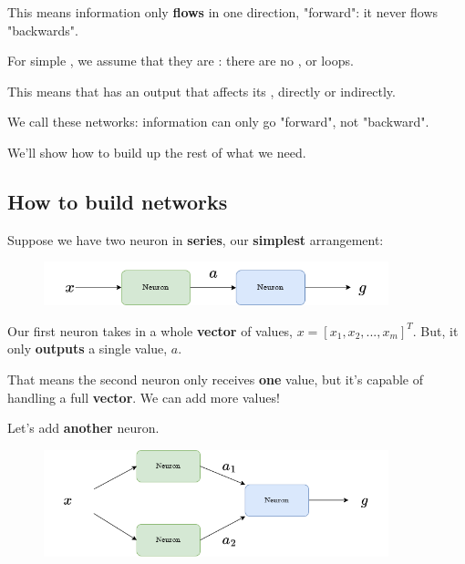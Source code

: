         This means information only \textbf{flows} in one direction, "forward": it never flows "backwards".\\
        
        \begin{concept}
            For simple , we assume that they are : there are no , or loops.
            
            This means that  has an output that affects its , directly or indirectly.
            
            We call these  networks: information can only go "forward", not "backward".
        \end{concept}
        
        We'll show how to build up the rest of what we need.
    
    \subsection{How to build networks}
        
        Suppose we have two neuron in \textbf{series}, our \textbf{simplest} arrangement:
        
        \begin{figure}[H]
            \centering
            \includegraphics[width=100mm,scale=0.4]{images/nn_images/series_a.png}
        \end{figure}
        
        Our first neuron takes in a whole \textbf{vector} of values, $x = [x_1, x_2, ..., x_m]^T$. But, it only \textbf{outputs} a single value, $a$.
        
        That means the second neuron only receives \textbf{one} value, but it's capable of handling a full \textbf{vector}. We can add more values!
        
        Let's add \textbf{another} neuron.
        
        \begin{figure}[H]
            \centering
            \includegraphics[width=100mm,scale=0.4]{images/nn_images/two_neurons_a.png}
        \end{figure}
        
